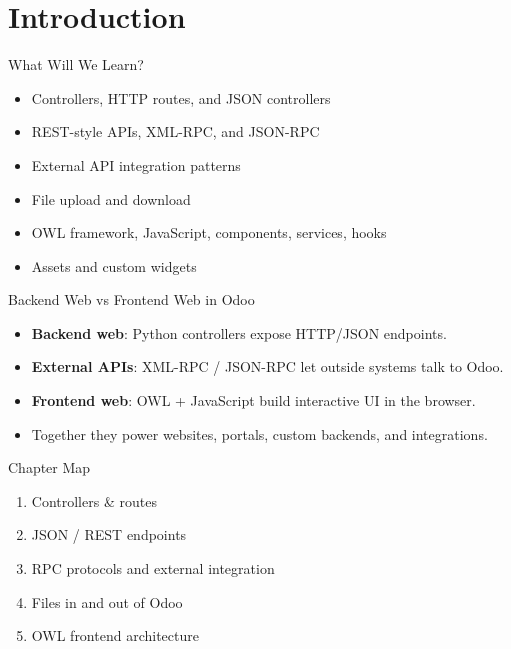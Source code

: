 \section{Introduction}

\begin{frame}{What Will We Learn?}
	\begin{itemize}
		\item Controllers, HTTP routes, and JSON controllers
		\item REST-style APIs, XML-RPC, and JSON-RPC
		\item External API integration patterns
		\item File upload and download
		\item OWL framework, JavaScript, components, services, hooks
		\item Assets and custom widgets
	\end{itemize}
\end{frame}

\begin{frame}{Backend Web vs Frontend Web in Odoo}
	\begin{itemize}
		\item \textbf{Backend web}: Python controllers expose HTTP/JSON endpoints.
		\item \textbf{External APIs}: XML-RPC / JSON-RPC let outside systems talk to Odoo.
		\item \textbf{Frontend web}: OWL + JavaScript build interactive UI in the browser.
		\item Together they power websites, portals, custom backends, and integrations.
	\end{itemize}
\end{frame}

\begin{frame}{Chapter Map}
	\begin{enumerate}
		\item Controllers \& routes
		\item JSON / REST endpoints
		\item RPC protocols and external integration
		\item Files in and out of Odoo
		\item OWL frontend architecture
	\end{enumerate}
\end{frame}
